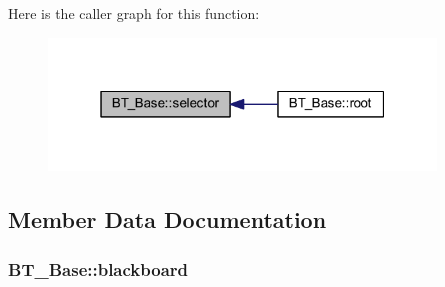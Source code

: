 Here is the caller graph for this function\+:\nopagebreak
\begin{figure}[H]
\begin{center}
\leavevmode
\includegraphics[width=292pt]{class_b_t___base_adbbf3731340b4e525a1ea549fd6409f3_icgraph}
\end{center}
\end{figure}




\subsection{Member Data Documentation}
\subsubsection[{\texorpdfstring{blackboard}{blackboard}}]{ B\+T\+\_\+\+Base\+::blackboard\hspace{0.3cm}{\ttfamily [private]}}\hypertarget{class_b_t___base_ad6873a8492447b0b9d0eef5b28032a9d}{}\label{class_b_t___base_ad6873a8492447b0b9d0eef5b28032a9d}
